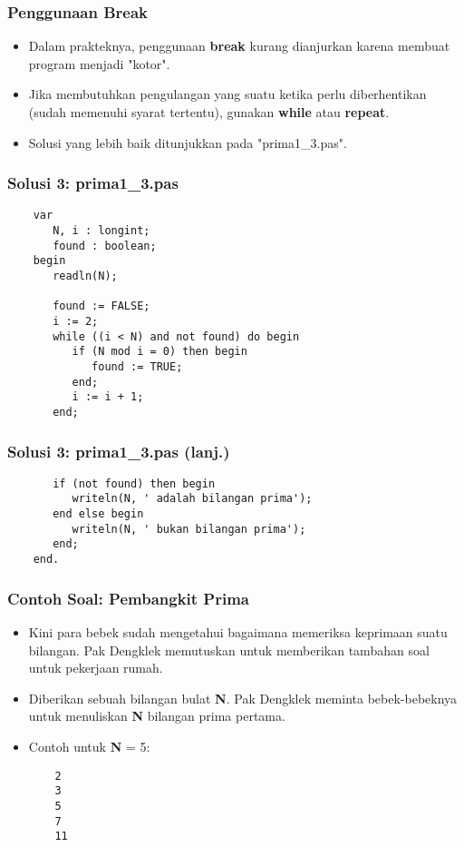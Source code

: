 \documentclass{beamer}
\begin{document}
\begin{frame}
\frametitle{Penggunaan Break}
\begin{itemize}
    \item Dalam prakteknya, penggunaan \textbf{break} kurang dianjurkan karena membuat program menjadi "kotor".
    \item Jika membutuhkan pengulangan yang suatu ketika perlu diberhentikan (sudah memenuhi syarat tertentu), gunakan \textbf{while} atau \textbf{repeat}.
    \item Solusi yang lebih baik ditunjukkan pada "prima1\_3.pas".
\end{itemize}
\end{frame}

\begin{frame}[fragile]
\frametitle{Solusi 3: prima1\_3.pas}
\begin{lstlisting}
    var
       N, i : longint;
       found : boolean;
    begin
       readln(N);

       found := FALSE;
       i := 2;
       while ((i < N) and not found) do begin
          if (N mod i = 0) then begin
             found := TRUE;
          end;
          i := i + 1;
       end;
\end{lstlisting}
\end{frame}

\begin{frame}[fragile]
\frametitle{Solusi 3: prima1\_3.pas (lanj.)}
\begin{lstlisting}
       if (not found) then begin
          writeln(N, ' adalah bilangan prima');
       end else begin
          writeln(N, ' bukan bilangan prima');
       end;
    end.
\end{lstlisting}
\end{frame}

\begin{frame}[fragile]
\frametitle{Contoh Soal: Pembangkit Prima}
\begin{itemize}
    \item Kini para bebek sudah mengetahui bagaimana memeriksa keprimaan suatu bilangan. Pak Dengklek memutuskan untuk memberikan tambahan soal untuk pekerjaan rumah.
    \item Diberikan sebuah bilangan bulat \textbf{N}. Pak Dengklek meminta bebek-bebeknya untuk menuliskan \textbf{N} bilangan prima pertama.
    \item Contoh untuk \textbf{N} = 5:
    \begin{lstlisting}
    2
    3
    5
    7
    11
    \end{lstlisting}
\end{itemize}
\end{frame}
\end{document}
